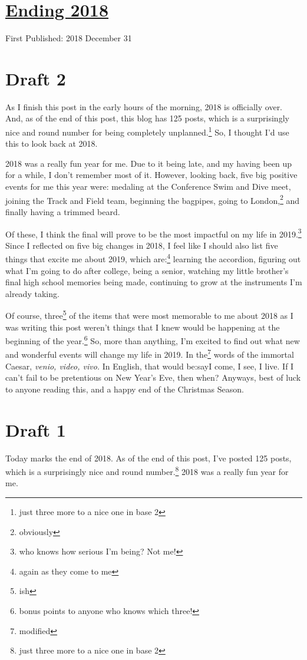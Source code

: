 \documentclass[12pt]{article}[titlepage]
\newcommand{\1}{\={a}}
\newcommand{\2}{\={e}}
\newcommand{\3}{\={\i}}
\newcommand{\4}{\=o}
\newcommand{\5}{\=u}
\newcommand{\6}{\={A}}
\renewcommand{\,}{\textsuperscript{,}}
\begin{document}
\doublespacing
\section{\href{ending-18.html}{Ending 2018}}
First Published: 2018 December 31
\section{Draft 2}
As I finish this post in the early hours of the morning, 2018 is officially over.
And, as of the end of this post, this blog has 125 posts, which is a surprisingly nice and round number for being completely unplanned.\footnote{just three more to a nice one in base 2}
So, I thought I'd use this to look back at 2018.

2018 was a really fun year for me.
Due to it being late, and my having been up for a while, I don't remember most of it.
However, looking back, five big positive events for me this year were:
medaling at the Conference Swim and Dive meet,
joining the Track and Field team,
beginning the bagpipes,
going to London,\footnote{obviously}
and finally having a trimmed beard.

Of these, I think the final will prove to be the most impactful on my life in 2019.\footnote{who knows how serious I'm being? Not me!}
Since I reflected on five big changes in 2018, I feel like I should also list five things that excite me about 2019, which are:\footnote{again as they come to me}
learning the accordion,
figuring out what I'm going to do after college,
being a senior,
watching my little brother's final high school memories being made,
continuing to grow at the instruments I'm already taking.

Of course, three\footnote{ish} of the items that were most memorable to me about 2018 as I was writing this post weren't things that I knew would be happening at the beginning of the year.\footnote{bonus points to anyone who knows which three!}
So, more than anything, I'm excited to find out what new and wonderful events will change my life in 2019.
In the\footnote{modified} words of the immortal Caesar, \textit{venio, video, vivo.}
In English, that would be:say{I come, I see, I live.}
If I can't fail to be pretentious on New Year's Eve, then when?
Anyways, best of luck to anyone reading this, and a happy end of the Christmas Season.

\section{Draft 1}
Today marks the end of 2018.
As of the end of this post, I've posted 125 posts, which is a surprisingly nice and round number.\footnote{just three more to a nice one in base 2}
2018 was a really fun year for me.
\end{document}
